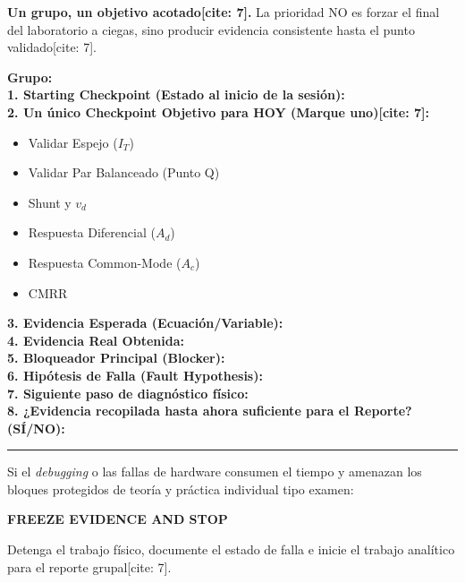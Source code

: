 \documentclass[11pt, a4paper]{article}
\begin{document}
\begin{tcolorbox}[colback=ucbblue!5, colframe=ucbblue, title=\textbf{Auditoría: Cierre Acotado de Laboratorio Hito 2}]
    \textbf{Un grupo, un objetivo acotado[cite: 7].} La prioridad NO es forzar el final del laboratorio a ciegas, sino producir evidencia consistente hasta el punto validado[cite: 7].
\end{tcolorbox}

\vspace{0.5cm}

\noindent\textbf{Grupo:} \hrulefill \\[0.4cm]
\noindent\textbf{1. Starting Checkpoint (Estado al inicio de la sesión):} \hrulefill \\[0.4cm]
\noindent\textbf{2. Un único Checkpoint Objetivo para HOY (Marque uno)[cite: 7]:} 
\begin{itemize}
    \item[$\square$] Validar Espejo ($I_T$)
    \item[$\square$] Validar Par Balanceado (Punto Q)
    \item[$\square$] Shunt y $v_d$
    \item[$\square$] Respuesta Diferencial ($A_d$)
    \item[$\square$] Respuesta Common-Mode ($A_c$)
    \item[$\square$] CMRR
\end{itemize}

\vspace{0.2cm}
\noindent\textbf{3. Evidencia Esperada (Ecuación/Variable):} \hrulefill \\[0.4cm]
\noindent\textbf{4. Evidencia Real Obtenida:} \hrulefill \\[0.4cm]
\noindent\textbf{5. Bloqueador Principal (Blocker):} \hrulefill \\[0.4cm]
\noindent\textbf{6. Hipótesis de Falla (Fault Hypothesis):} \hrulefill \\[0.4cm]
\noindent\textbf{7. Siguiente paso de diagnóstico físico:} \hrulefill \\[0.4cm]
\noindent\textbf{8. ¿Evidencia recopilada hasta ahora suficiente para el Reporte? (SÍ/NO):} \rule{2cm}{0.15mm}

\vspace{1cm}
\begin{tcolorbox}[colback=red!5, colframe=red!70!black, title=\textbf{Regla de Parada Oficial (Stop Rule)[cite: 7]}]
    Si el \textit{debugging} o las fallas de hardware consumen el tiempo y amenazan los bloques protegidos de teoría y práctica individual tipo examen:
    \begin{center}
        \Large \textbf{FREEZE EVIDENCE AND STOP} \quad \text{[cite: 7]}
    \end{center}
    Detenga el trabajo físico, documente el estado de falla e inicie el trabajo analítico para el reporte grupal[cite: 7].
\end{tcolorbox}
\end{document}
